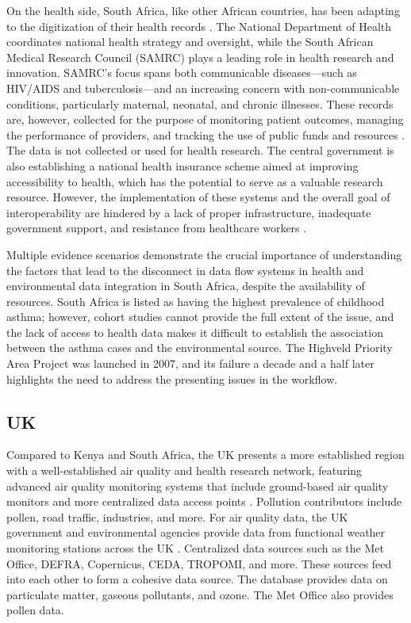 \documentclass{article}
\begin{document}
On the health side, South Africa, like other African countries, has been adapting to the digitization of their health records \cite{katurura_electronic_2018}. The National Department of Health coordinates national health strategy and oversight, while the South African Medical Research Council (SAMRC) plays a leading role in health research and innovation. SAMRC’s focus spans both communicable diseases—such as HIV/AIDS and tuberculosis—and an increasing concern with non-communicable conditions, particularly maternal, neonatal, and chronic illnesses. These records are, however, collected for the purpose of monitoring patient outcomes, managing the performance of providers, and tracking the use of public funds and resources \cite{conco_accessing_2025}. The data is not collected or used for health research. The central government is also establishing a national health insurance scheme aimed at improving accessibility to health, which has the potential to serve as a valuable research resource. However, the implementation of these systems and the overall goal of interoperability are hindered by a lack of proper infrastructure, inadequate government support, and resistance from healthcare workers \cite{wright_electronic_2017}. 

Multiple evidence scenarios demonstrate the crucial importance of understanding the factors that lead to the disconnect in data flow systems in health and environmental data integration in South Africa, despite the availability of resources. South Africa is listed as having the highest prevalence of childhood asthma; however, cohort studies cannot provide the full extent of the issue, and the lack of access to health data makes it difficult to establish the association between the asthma cases and the environmental source. The Highveld Priority Area Project was launched in 2007, and its failure a decade and a half later highlights the need to address the presenting issues in the workflow. 


\subsection{UK}
Compared to Kenya and South Africa, the UK presents a more established region with a well-established air quality and health research network, featuring advanced air quality monitoring systems that include ground-based air quality monitors and more centralized data access points \cite{noauthor_defra_nodate}. Pollution contributors include pollen, road traffic, industries, and more. For air quality data, the UK government and environmental agencies provide data from functional weather monitoring stations across the UK \cite{noauthor_air_2025}. Centralized data sources such as the Met Office, DEFRA, Copernicus, CEDA, TROPOMI, and more. These sources feed into each other to form a cohesive data source. The database provides data on particulate matter, gaseous pollutants, and ozone. The Met Office also provides pollen data.              
\end{document}
